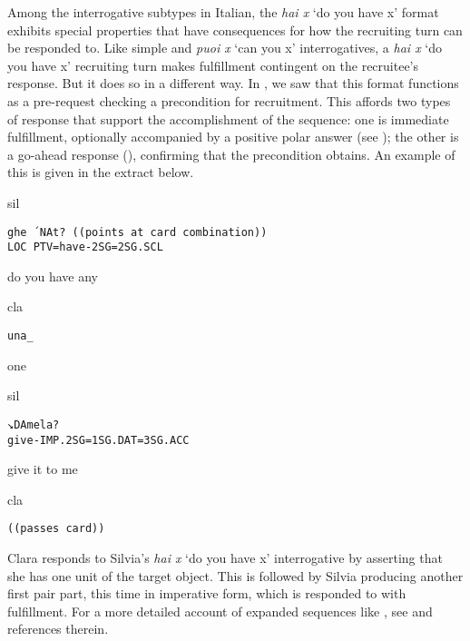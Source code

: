 \documentclass[output=paper,modfonts]{langscibook}
\begin{document}
Among the interrogative subtypes in Italian, the \textit{hai x} ‘do you have x’ format exhibits special properties that have consequences for how the recruiting turn can be responded to. Like simple and \textit{puoi x} ‘can you x’ interrogatives, a \textit{hai x} ‘do you have x’ recruiting turn makes fulfillment contingent on the recruitee's response. But it does so in a different way. In , we saw that this format functions as a pre-request checking a precondition for recruitment. This affords two types of response that support the accomplishment of the sequence: one is immediate fulfillment, optionally accompanied by a positive polar answer (see ); the other is a go-ahead response (\citealt[30]{Schegloff2007}), confirming that the precondition obtains. An example of this is given in the extract below.

\vspace{-1mm}
%
\begin{mdframednoverticalspace}[style=firstfoc]
\begin{transbox}{1}{sil}
\begin{verbatim}
ghe ´NAt? ((points at card combination))
LOC PTV=have-2SG=2SG.SCL
\end{verbatim}
do you have any
\end{transbox}
\end{mdframednoverticalspace}\vspace{0.75mm}
%
\begin{mdframednoverticalspace}[style=secondfoc]
\begin{transbox}{2}{cla}
\begin{verbatim}
una_
\end{verbatim}
one
\end{transbox}
\end{mdframednoverticalspace}\vspace{1.5mm}
%
\begin{transbox}{3}{sil}
\begin{verbatim}
↘DAmela?
give-IMP.2SG=1SG.DAT=3SG.ACC
\end{verbatim}
give it to me
\end{transbox}
%
\begin{transbox}{4}{cla}
\begin{verbatim}
((passes card))
\end{verbatim}
\end{transbox}\bigskip

Clara responds to Silvia's \textit{hai x} ‘do you have x’ interrogative by asserting that she has one unit of the target object. This is followed by Silvia producing another first pair part, this time in imperative form, which is responded to with fulfillment. For a more detailed account of expanded sequences like , see \cite{Rossi2015b} and references therein. %
\end{document}
